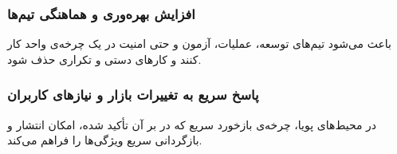 \subsubsection*{افزایش بهره‌وری و هماهنگی تیم‌ها}
 باعث می‌شود تیم‌های توسعه، عملیات، آزمون و حتی امنیت در یک چرخه‌ی واحد کار کنند و کارهای دستی و تکراری حذف شود.

\subsubsection*{پاسخ سریع به تغییرات بازار و نیازهای کاربران}
در محیط‌های پویا، چرخه‌ی بازخورد سریع که در \cite{Jha2023} بر آن تأکید شده، امکان انتشار و بازگردانی سریع ویژگی‌ها را فراهم می‌کند.
